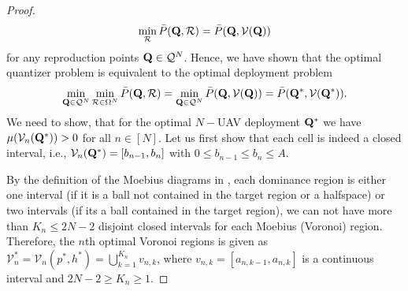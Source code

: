 \documentclass[smallabstract,smallcaptions]{dccpaper}
\newcommand{\Pbar}{\ensuremath{\bar{P}}}         %
\newcommand{\Vor}{\ensuremath{\mathcal{V}}}         %
\newcommand{\Rset}{\ensuremath{\mathcal R}}
\newcommand{\Qset}{\ensuremath{\mathcal Q}}
\begin{document}
\begin{proof}
\begin{align}
    \min_{\Rset} \Pbar(\vQ,\Rset)=\Pbar(\vQ,\Vor(\vQ))
  \end{align}
  for any reproduction points $\vQ\in\Qset^N$.
  Hence, we have shown that the optimal quantizer problem is equivalent to the optimal deployment problem
  \begin{align}
    \min_{\vQ\in\Qset^N} \min_{\Rset\in\Ome^N} \Pbar(\vQ,\Rset) = \min_{\vQ\in\Qset^N}
    \Pbar(\vQ,\Vor(\vQ))=\Pbar(\vQ^*,\Vor(\vQ^*)).\label{eq:optquanteqoptdeploy}
  \end{align}
  We need to show, that for the optimal $N-$UAV deployment $\mathbf Q^*$ we have $\mu(\Vor_n(\vQ^*))>0$ for all $n\in[N]$.
  Let us first show that each cell is indeed a closed interval, i.e., $\Vor_n(\vQ^*)=[b_{n-1},b_n]$ with $0\leq b_{n-1}\leq
  b_n\leq A$. 
  
  By the definition of the
  Moebius diagrams in , each dominance region is either one interval (if it is a ball not contained
  in the target region or a halfspace) or two intervals (if its a ball contained in the target region), we can not have
  more than $K_n\leq 2N-2$ disjoint closed intervals for each Moebius (Voronoi) region.  Therefore, the $n$th optimal
  Voronoi regions is given as $\Vor^*_n=\Vor_n(p^*, h^*)=\bigcup_{k=1}^{K_n}v_{n,k}$, where $v_{n,k}=[a_{n,k-1},a_{n,k}]$
  is a continuous interval and $2N-2\geq K_n\geq 1$.


\end{proof}
\end{document}
